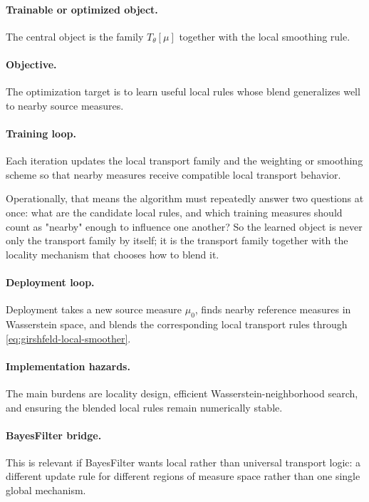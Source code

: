 \documentclass[11pt]{report}
\begin{document}
\paragraph{Trainable or optimized object.}
The central object is the family $T_\theta[\mu]$ together with the local smoothing
rule.

\paragraph{Objective.}
The optimization target is to learn useful local rules whose blend generalizes well
to nearby source measures.

\paragraph{Training loop.}
Each iteration updates the local transport family and the weighting or smoothing
scheme so that nearby measures receive compatible local transport behavior.

Operationally, that means the algorithm must repeatedly answer two questions at
once: what are the candidate local rules, and which training measures should count as
"nearby" enough to influence one another?  So the learned object is never only the
transport family by itself; it is the transport family together with the locality
mechanism that chooses how to blend it.

\paragraph{Deployment loop.}
Deployment takes a new source measure $\mu_0$, finds nearby reference measures in
Wasserstein space, and blends the corresponding local transport rules through
\eqref{eq:girshfeld-local-smoother}.

\paragraph{Implementation hazards.}
The main burdens are locality design, efficient Wasserstein-neighborhood search, and
ensuring the blended local rules remain numerically stable.

\paragraph{BayesFilter bridge.}
This is relevant if BayesFilter wants local rather than universal transport logic:
a different update rule for different regions of measure space rather than one
single global mechanism.
\end{document}
